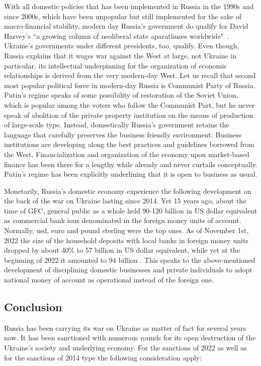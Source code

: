 With all domestic policies that has been implemented in Russia in the
1990s and since 2000s, which have been unpopular but still implemented
for the sake of macro-financial stability, modern day Russia's
government do qualify for David Harvey's ``a growing column of neoliberal
state aparathuses worldwide"~\citep[p.~29]{dharvey}. Ukraine's governments
under different presidents, too, qualify. Even though, Russia explains
that it wages war against the West at large, not Ukraine in particular,
its intellectual underpinning for the organization of economic
relationships is derived from the very modern-day West. Let us recall
that second most popular political force in modern-day Russia is
Communist Party of Russia. Putin's regime speaks of some possibility of
restoration of the Soviet Union, which is popular among the voters who
follow the Communist Part, but he never speak of abolition of the
private property institution on the means of production of large-scale
type. Instead, domestically Russia's government retains the language
that carefully preserves the business friendly environment. Business
institutions are developing along the best practices and guidelines
borrowed from the West. Financialization and organization of the economy
upon market-based finance has been there for a lengthy while already and
never curtails conceptually. Putin's regime has been explicitly
underlining that it is open to business as usual.

Monetarily, Russia's domestic economy experience the following
development on the back of the war on Ukraine lasting since 2014. Yet 15
years ago, about the time of GFC, general public as a whole held 90-120
billion in US dollar equivalent as commercial bank \acp{iou} denominated in
the foreign money units of account. Normally, \acf{usd}, euro and pound
sterling were the top ones. As of November 1st, 2022 the size of the
household deposits with local banks in foreign money units dropped by
about 40\% to 57 billion in US dollar equivalent, while yet at the
beginning of 2022 it amounted to 94 billion \citep{zadornov}. This speaks to
the above-mentioned development of disciplining domestic businesses and
private individuals to adopt national money of account as
operational instead of the foreign one.

\subsection{Conclusion}

Russia has been carrying its war on Ukraine as matter of fact for
several years now. It has been sanctioned with numerous rounds for its
open destruction of the Ukraine's society and underlying economy. For
the sanctions of 2022 as well as for the sanctions of 2014 type the
following consideration apply:

